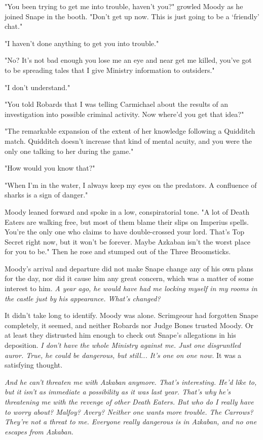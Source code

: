 "You been trying to get me into trouble, haven't you?" growled Moody as he joined Snape in the booth. "Don't get up now. This is just going to be a `friendly' chat."

"I haven't done anything to get you into trouble."

"No? It's not bad enough you lose me an eye and near get me killed, you've got to be spreading tales that I give Ministry information to outsiders."

"I don't understand."

"You told Robards that I was telling Carmichael about the results of an investigation into possible criminal activity. Now where'd you get that idea?"

"The remarkable expansion of the extent of her knowledge following a Quidditch match. Quidditch doesn't increase that kind of mental acuity, and you were the only one talking to her during the game."

"How would you know that?"

"When I'm in the water, I always keep my eyes on the predators. A confluence of sharks is a sign of danger."

Moody leaned forward and spoke in a low, conspiratorial tone. "A lot of Death Eaters are walking free, but most of them blame their slips on Imperius spells. You're the only one who claims to have double-crossed your lord. That's Top Secret right now, but it won't be forever. Maybe Azkaban isn't the worst place for you to be." Then he rose and stumped out of the Three Broomsticks.

Moody's arrival and departure did not make Snape change any of his own plans for the day, nor did it cause him any great concern, which was a matter of some interest to him. \emph{A year ago, he would have had me locking myself in my rooms in the castle just by his appearance. What's changed?}

It didn't take long to identify. Moody was alone. Scrimgeour had forgotten Snape completely, it seemed, and neither Robards nor Judge Bones trusted Moody. Or at least they distrusted him enough to check out Snape's allegations in his deposition. \emph{I don't have the whole Ministry against me. Just one disgruntled auror. True, he could be dangerous, but still... It's one on one now.} It was a satisfying thought.

\emph{And he can't threaten me with Azkaban anymore. That's interesting. He'd like to, but it isn't as immediate a possibility as it was last year. That's why he's threatening me with the revenge of other Death Eaters. But who do I really have to worry about? Malfoy? Avery? Neither one wants more trouble. The Carrows? They're not a threat to me. Everyone really dangerous is in Azkaban, and no one escapes from Azkaban.}

